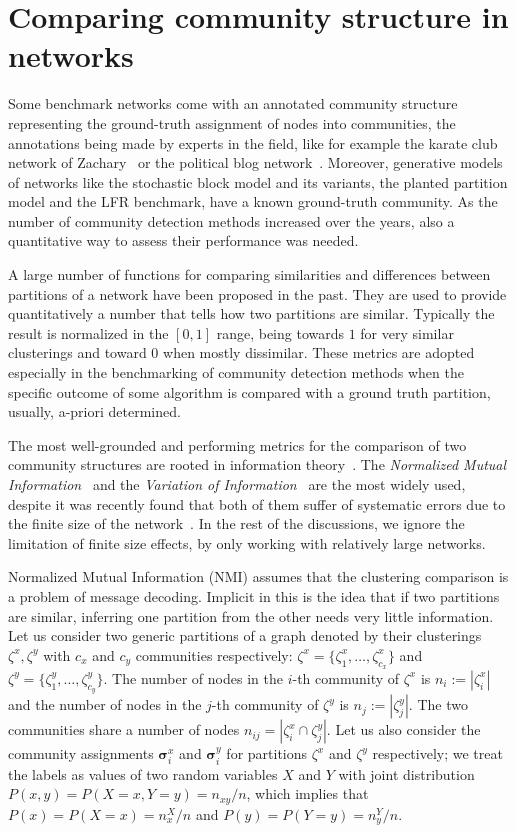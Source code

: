 \section{Comparing community structure in networks}
Some benchmark networks come with an annotated community structure representing the ground-truth assignment of nodes into communities, the annotations being made by experts in the field, like for example the karate club network of Zachary~\cite{zachary1977} or the political blog network~\cite{adamic2005}.
Moreover, generative models of networks like the stochastic block model and its variants, the planted partition model and the LFR benchmark, have a known ground-truth community.
As the number of community detection methods increased over the years, also a quantitative way to assess their performance was needed.

A large number of functions for comparing similarities and differences between partitions of a network have been proposed in the past.
They are used to provide quantitatively a number that tells how two partitions are similar.
Typically the result is normalized in the $[0,1]$ range, being towards $1$ for very similar clusterings and toward $0$ when mostly dissimilar.
These metrics are adopted especially in the benchmarking of community detection methods when the specific outcome of some algorithm is compared with a ground truth partition, usually, a-priori determined.

The most well-grounded and performing metrics for the comparison of two community structures are rooted in information theory~\cite{cover2006}.
The \emph{Normalized Mutual Information}~\cite{danon2005} and the \emph{Variation of Information}~\cite{meila2007} are the most widely used, despite it was recently found that both of them suffer of systematic errors due to the finite size of the network~\cite{zhang2015a}.
In the rest of the discussions, we ignore the limitation of finite size effects, by only working with relatively large networks.

Normalized Mutual Information (NMI) assumes that the clustering comparison is a problem of message decoding.
Implicit in this is the idea that if two partitions are similar, inferring one partition from the other needs very little information.
Let us consider two generic partitions of a graph denoted by their clusterings $\zeta^x,\zeta^y$ with $c_x$ and $c_y$ communities respectively: $\zeta^x=\{\zeta^x_1,\ldots,\zeta^x_{c_x}\}$ and $\zeta^y=\{\zeta^y_1,\ldots,\zeta^y_{c_y}\}$.
The number of nodes in the $i$-th community of $\zeta^x$ is $n_i :=|\zeta^x_i|$ and the number of nodes in the $j$-th community of $\zeta^y$ is $n_j:=|\zeta^y_j|$.
The two communities share a number of nodes $n_{ij}=| \zeta^x_i \cap \zeta^y_j|$.
Let us also consider the community assignments $\boldsymbol\sigma^x_i$ and $\boldsymbol\sigma^y_i$ for partitions $\zeta^x$ and $\zeta^y$ respectively; we treat the labels as values of two random variables $X$ and $Y$ with joint distribution $P(x,y)=P(X=x, Y=y) = n_{xy}/n$, which implies that $P(x)=P(X=x)=n_x^X/n$ and $P(y)=P(Y=y)=n_y^Y/n$.

